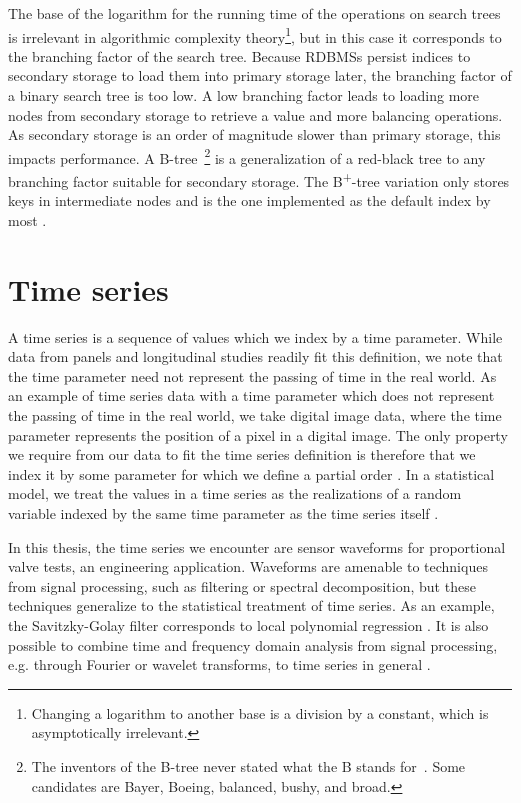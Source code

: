 The base of the logarithm for the running time of the operations on search trees is irrelevant in algorithmic complexity theory\footnote{Changing a logarithm to another base is a division by a constant, which is asymptotically irrelevant.}, but in this case it corresponds to the branching factor of the search tree.
Because RDBMSs persist indices to secondary storage to load them into primary storage later, the branching factor of a binary search tree is too low.
A low branching factor leads to loading more nodes from secondary storage to retrieve a value and more balancing operations.
As secondary storage is an order of magnitude slower than primary storage, this impacts performance.
A B-tree~\citep{DBLP:journals/acta/BayerM72}\footnote{The inventors of the B-tree never stated what the B stands for~\citep{DBLP:journals/csur/Comer79}. Some candidates are Bayer, Boeing, balanced, bushy, and broad.} is a generalization of a red-black tree to any branching factor suitable for secondary storage.
The B\textsuperscript{+}-tree variation only stores keys in intermediate nodes and is the one implemented as the default index by most .

\section{Time series}

A time series is a sequence of values which we index by a time parameter.
While data from panels and longitudinal studies readily fit this definition, we note that the time parameter need not represent the passing of time in the real world.
As an example of time series data with a time parameter which does not represent the passing of time in the real world, we take digital image data, where the time parameter represents the position of a pixel in a digital image.
The only property we require from our data to fit the time series definition is therefore that we index it by some parameter for which we define a partial order \citep{davey2002introduction}.
In a statistical model, we treat the values in a time series as the realizations of a random variable indexed by the same time parameter as the time series itself \citep{shumway2000time}.

In this thesis, the time series we encounter are sensor waveforms for proportional valve tests, an engineering application.
Waveforms are amenable to techniques from signal processing, such as filtering or spectral decomposition, but these techniques generalize to the statistical treatment of time series.
As an example, the Savitzky-Golay filter \citep{savitzky1964smoothing} corresponds to local polynomial regression \citep{cleveland1979robust}.
It is also possible to combine time and frequency domain analysis from signal processing, e.g. through Fourier or wavelet transforms, to time series in general \citep{shumway2000time}.

